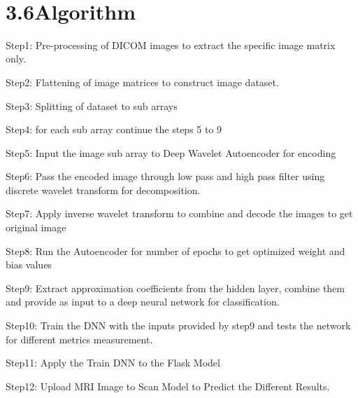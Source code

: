 \documentclass[oneside,a4paper,12pt]{book}
\begin{document}
\begin{Center}










\\

\end{Center}\par
\newpage
\section*{3.6\hspace*{10pt}Algorithm}
\item Step1: Pre-processing of DICOM images to extract the specific image matrix only. 
\item Step2: Flattening of image matrices to construct image dataset. 
\item Step3: Splitting of dataset to sub arrays 
\item Step4: for each sub array continue the steps 5 to 9 
\item Step5: Input the image sub array to Deep Wavelet Autoencoder for encoding 
\item Step6: Pass the encoded image through low pass and high pass filter using discrete wavelet transform for decomposition. 
\item Step7: Apply inverse wavelet transform to combine and decode the images to get original image 
\item Step8: Run the Autoencoder for number of epochs to get optimized weight and bias values 
\item Step9: Extract approximation coefficients from the hidden layer, combine them and provide as input to a deep neural network for classification. 
\item Step10: Train the DNN with the inputs provided by step9 and tests the network for different metrics measurement. 
\item Step11: Apply the Train DNN to the Flask Model 
\item Step12: Upload MRI Image to Scan Model to Predict the Different Results.


\end{document}
